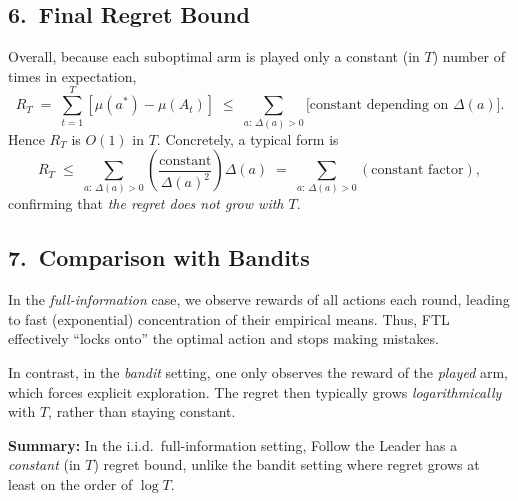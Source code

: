 \subsection*{6.\ Final Regret Bound}

Overall, because each suboptimal arm is played only a constant (in $T$) number of times in expectation,
\[
  R_T 
  \;=\;
  \sum_{t=1}^T [\mu(a^*) - \mu(A_t)]
  \;\le\;
  \sum_{a:\,\Delta(a)>0}
  \bigl[\text{constant depending on $\Delta(a)$}\bigr].
\]
Hence $R_T$ is $O(1)$ in $T$.  Concretely, a typical form is
\[
  R_T
  \;\le\;
  \sum_{a:\,\Delta(a)>0}
  \left(
    \frac{\text{constant}}{\Delta(a)^2}
  \right)\Delta(a)
  \;=\;
  \sum_{a:\,\Delta(a)>0}\!\!
  \left(\text{constant factor}\right),
\]
confirming that \emph{the regret does not grow with $T$}.

\subsection*{7.\ Comparison with Bandits}

In the \emph{full-information} case, we observe rewards of all actions each round, leading to fast (exponential) concentration of their empirical means.  Thus, FTL effectively ``locks onto'' the optimal action and stops making mistakes.  

In contrast, in the \emph{bandit} setting, one only observes the reward of the \emph{played} arm, which forces explicit exploration.  The regret then typically grows \emph{logarithmically} with $T$, rather than staying constant.

\bigskip

\noindent\textbf{Summary:} In the i.i.d.\ full-information setting, Follow the Leader has a \emph{constant} (in $T$) regret bound, unlike the bandit setting where regret grows at least on the order of $\log T$.


